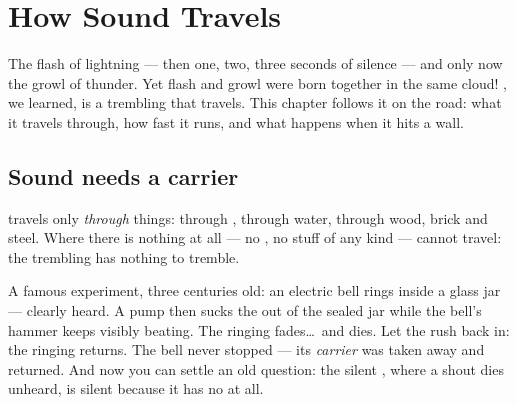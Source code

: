 \chapter{How Sound Travels}\label{ch:g4:how-sound-travels}

The flash of lightning --- then one, two, three seconds of silence
--- and only now the growl of thunder. Yet flash and growl were
born together in the same cloud! , we learned, is a trembling
that travels. This chapter follows it on the road: what it travels
through, how fast it runs, and what happens when it hits a wall.

\section{Sound needs a carrier}

\begin{proposition}\label{prop:g4:how-sound-travels:carrier}
 travels only \emph{through} things: through , through
water, through wood, brick and steel. Where there is nothing at all
--- no , no stuff of any kind ---  cannot travel: the
trembling has nothing to tremble.
\end{proposition}

\begin{example}\label{ex:g4:how-sound-travels:jar}
A famous experiment, three centuries old: an electric bell rings
inside a glass jar --- clearly heard. A pump then sucks the  out
of the sealed jar while the bell's hammer keeps visibly beating.
The ringing fades\dots\ and dies. Let the  rush back in: the
ringing returns. The bell never stopped --- its \emph{carrier} was
taken away and returned. And now you can settle an old question:
the silent , where a shout dies unheard, is silent because it
has no  at all.
\end{example}

